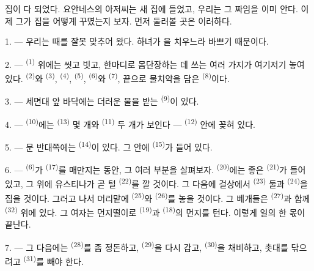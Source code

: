 집이 다 되었다. 요안네스의 아저씨는 새 집에 들었고, 우리는 그 짜임을 이미 안다. 이제 그가
집을 어떻게 꾸몄는지 보자. 먼저 둘러볼 곳은 이러하다.

\VUsaut{3.0mm}

1. --- 우리는 때를 잘못 맞추어 왔다. 하녀가 을 치우느라 바쁘기 때문이다.

2. ---  \textsuperscript{(1)} 위에는 씻고 빗고, 한마디로 몸단장하는 데
쓰는 여러 가지가 여기저기 놓여 있다.  \textsuperscript{(2)}와
 \textsuperscript{(3)},  \textsuperscript{(4)}, 
\textsuperscript{(5)},  \textsuperscript{(6)}와 
\textsuperscript{(7)}, 끝으로 물치약을 담은  \textsuperscript{(8)}이다.

3. --- 세면대 앞 바닥에는 더러운 물을 받는  \textsuperscript{(9)}이 있다.

4. ---  \textsuperscript{(10)}에는  \textsuperscript{(13)} 몇 개와
 \textsuperscript{(11)} 두 개가 보인다 —  \textsuperscript{(12)}
안에 꽂혀 있다.

5. --- 문 반대쪽에는  \textsuperscript{(14)}이 있다. 그 안에
 \textsuperscript{(15)}가 들어 있다.

6. ---  \textsuperscript{(6)}가  \textsuperscript{(17)}를 매만지는
동안, 그 여러 부분을 살펴보자.  \textsuperscript{(20)}에는 좋은
 \textsuperscript{(21)}가 들어 있고, 그 위에 유스티나가 곧 털
 \textsuperscript{(22)}를 깔 것이다. 그 다음에 걸상에서 
\textsuperscript{(23)} 둘과  \textsuperscript{(24)}을 집을 것이다. 그러고 나서
머리맡에  \textsuperscript{(25)}와  \textsuperscript{(26)}를
놓을 것이다. 그 베개들은  \textsuperscript{(27)}과 함께
 \textsuperscript{(32)} 위에 있다. 그 여자는 먼지떨이로 
\textsuperscript{(19)}과  \textsuperscript{(18)}의 먼지를 턴다. 이렇게
일의 한 몫이 끝난다.

7. --- 그 다음에는  \textsuperscript{(28)}를 좀 정돈하고,
 \textsuperscript{(29)}을 다시 감고,  \textsuperscript{(30)}을
채비하고, 촛대를 닦으려고  \textsuperscript{(31)}를 빼야 한다.

